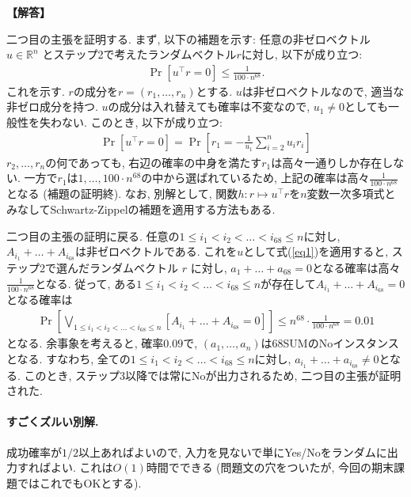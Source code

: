 \documentclass[12pt,a4paper]{article}
\newenvironment{solution}{
    \vspace{0.5em}
    \begin{tcolorbox}[colback=white, colframe=black, boxrule=1pt, arc=0mm, breakable]
    \noindent
    \textbf{【解答】}
    \vspace{0.3em}
}{
    \end{tcolorbox}
    \vspace{1em}
}
\begin{document}
\begin{solution}
  二つ目の主張を証明する. まず, 以下の補題を示す:
  任意の非ゼロベクトル $u\in \mathbb{R}^n$ とステップ2で考えたランダムベクトル$r$に対し, 以下が成り立つ:
  \begin{align}
    \Pr\left[u^\top r = 0\right] \le \frac{1}{100\cdot n^{68}}. \label{eq1}
  \end{align}
  これを示す. $r$の成分を$r=(r_1,\dots,r_n)$とする. $u$は非ゼロベクトルなので, 適当な非ゼロ成分を持つ. $u$の成分は入れ替えても確率は不変なので, $u_1\ne 0$としても一般性を失わない. このとき, 以下が成り立つ:
  \begin{align*}
    \Pr\left[u^\top r = 0\right] = \Pr\left[r_1 = -\frac{1}{u_1} \sum_{i=2}^n u_i r_i\right]
  \end{align*}
  $r_2,\dots,r_n$の何であっても, 右辺の確率の中身を満たす$r_1$は高々一通りしか存在しない. 一方で$r_1$は$1,\dots,100\cdot n^{68}$の中から選ばれているため, 上記の確率は高々$\frac{1}{100\cdot n^{68}}$となる (補題の証明終). なお, 別解として, 関数$h\colon r \mapsto u^\top r$を$n$変数一次多項式とみなしてSchwartz-Zippelの補題を適用する方法もある.

  二つ目の主張の証明に戻る. 任意の$1\le i_{1} < i_2 < \dots < i_{68} \le n$に対し, $A_{i_1}+\dots+A_{i_{68}}$は非ゼロベクトルである. これを$u$として式(\ref{eq1})を適用すると, ステップ2で選んだランダムベクトル $r$ に対し, $a_1+\dots+a_{68}=0$となる確率は高々$\frac{1}{100\cdot n^{68}}$となる. 従って, ある$1\le i_{1} < i_2 < \dots < i_{68} \le n$が存在して$A_{i_1}+\dots+A_{i_{68}}=0$となる確率は
  \begin{align*}
    \Pr\left[\bigvee_{1\le i_{1} < i_2 < \dots < i_{68} \le n} [A_{i_1}+\dots+A_{i_{68}}=0]\right] \le n^{68} \cdot \frac{1}{100\cdot n^{68}} = 0.01
  \end{align*}
  となる.
  余事象を考えると, 確率$0.09$で, $(a_1,\dots,a_n)$は68SUMのNoインスタンスとなる. すなわち, 全ての$1\le i_1 < i_2 < \dots < i_{68} \le n$に対し, $a_{i_1}+\dots+a_{i_{68}}\ne 0$となる. このとき, ステップ3以降では常にNoが出力されるため, 二つ目の主張が証明された.

  \paragraph*{すごくズルい別解.} 成功確率が$1/2$以上あればよいので, 入力を見ないで単にYes/Noをランダムに出力すればよい. これは$O(1)$時間でできる (問題文の穴をついたが, 今回の期末課題ではこれでもOKとする).


\end{solution}
\end{document}
